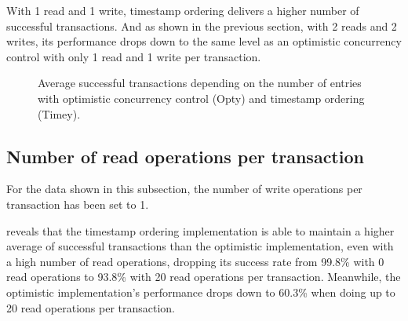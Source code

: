 \documentclass[a4paper, 10pt]{article}
\begin{document}
With 1 read and 1 write, timestamp ordering delivers a higher number of successful transactions. And as shown in the previous section, with 2 reads and 2 writes, its performance drops down to the same level as an optimistic concurrency control with only 1 read and 1 write per transaction.

\begin{figure}[htp]
\begin{center}
\caption{Average successful transactions depending on the  number of entries with optimistic concurrency control (Opty) and timestamp ordering (Timey).}
\label{fig:tnentries}
\end{center}
\end{figure}

\subsection{Number of read operations per transaction}

For the data shown in this subsection, the number of write operations per transaction has been set to 1.

 reveals that the timestamp ordering implementation is able to maintain a higher average of successful transactions than the optimistic im\-ple\-men\-ta\-tion, even with a high number of read operations, dropping its success rate from 99.8\% with 0 read operations to 93.8\% with 20 read operations per transaction. Meanwhile, the optimistic implementation's performance drops down to 60.3\% when doing up to 20 read operations per transaction.
\end{document}
